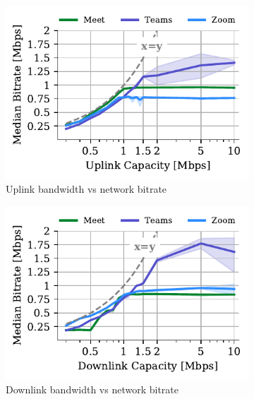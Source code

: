 \begin{figure}[t!]
\begin{subfigure}[t]{0.33\textwidth}
    \centering
    \includegraphics[width=\textwidth,keepaspectratio]{figures/static/uplink.pdf}
    \caption{Uplink bandwidth vs network bitrate}
	\label{subfig:uplink_bitrate}
\end{subfigure}\hfill
\begin{subfigure}[t]{0.33\textwidth}
\centering
    \includegraphics[width=\textwidth,keepaspectratio]{figures/static/downlink.pdf}
    \caption{Downlink bandwidth vs network bitrate}
	\label{subfig:downlink_bitrate}
\end{subfigure} \hfill
\begin{subfigure}[t]{0.33\textwidth}
\centering

\end{subfigure}
\end{figure}
